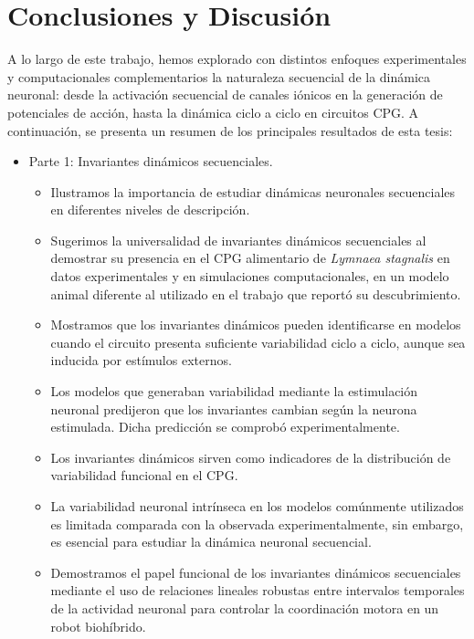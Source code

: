 \chapter{Conclusiones y Discusión} %

A lo largo de este trabajo, hemos explorado con distintos enfoques experimentales y computacionales complementarios la naturaleza secuencial de la dinámica neuronal: desde la activación secuencial de canales iónicos en la generación de potenciales de acción, hasta la dinámica ciclo a ciclo en circuitos CPG. A continuación, se presenta un resumen de los principales resultados de esta tesis:

\begin{itemize}
	\item Parte 1: Invariantes dinámicos secuenciales.
	\begin{itemize}
		\item Ilustramos la importancia de estudiar dinámicas neuronales secuenciales en diferentes niveles de descripción.
		\item Sugerimos la universalidad de invariantes dinámicos secuenciales al demostrar su presencia en el CPG alimentario de \textit{Lymnaea stagnalis} en datos experimentales y en simulaciones computacionales, en un modelo animal diferente al utilizado en el trabajo que reportó su descubrimiento.
		\item Mostramos que los invariantes dinámicos pueden identificarse en modelos cuando el circuito presenta suficiente variabilidad ciclo a ciclo, aunque sea inducida por estímulos externos.
		\item Los modelos que generaban variabilidad mediante la estimulación neuronal predijeron que los invariantes cambian según la neurona estimulada. Dicha predicción se comprobó experimentalmente.
		\item Los invariantes dinámicos sirven como indicadores de la distribución de variabilidad funcional en el CPG.
		\item La variabilidad neuronal intrínseca en los modelos comúnmente utilizados es limitada comparada con la observada experimentalmente, sin embargo, es esencial para estudiar la dinámica neuronal secuencial.
		\item Demostramos el papel funcional de los invariantes dinámicos secuenciales mediante el uso de relaciones lineales robustas entre  intervalos temporales de la actividad neuronal para controlar la coordinación motora en un robot biohíbrido.
	\end{itemize}
	

\end{itemize}
